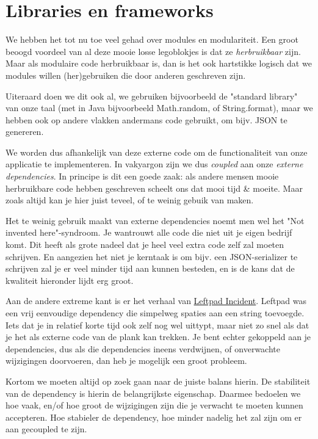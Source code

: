 \chapter{Libraries en frameworks}

We hebben het tot nu toe veel gehad over modules en modulariteit. 
Een groot beoogd voordeel van al deze mooie losse legoblokjes
is dat ze \emph{herbruikbaar} zijn. Maar als modulaire code herbruikbaar is, 
dan is het ook hartstikke logisch dat we modules willen (her)gebruiken die door anderen geschreven zijn.

Uiteraard doen we dit ook al, we gebruiken bijvoorbeeld de "standard library" van onze taal 
(met in Java bijvoorbeeld Math.random, of String.format), maar we hebben ook op andere vlakken andermans 
code gebruikt, om bijv. JSON te genereren.

We worden dus afhankelijk van deze externe code om de functionaliteit van onze applicatie te implementeren. 
In vakyargon zijn we dus \emph{coupled} aan onze \emph{externe dependencies}. In principe is dit een goede zaak:
als andere mensen mooie herbruikbare code hebben geschreven scheelt ons dat mooi tijd \& moeite. Maar zoals
altijd kan je hier juist teveel, of te weinig gebuik van maken.

Het te weinig gebruik maakt van externe dependencies noemt men wel het "Not invented here"-syndroom. 
Je wantrouwt alle code die niet uit je eigen bedrijf komt. Dit heeft als grote nadeel dat je heel veel extra
code zelf zal moeten schrijven. En aangezien het niet je kerntaak is om bijv. een JSON-serializer te schrijven
zal je er veel minder tijd aan kunnen besteden, en is de kans dat de kwaliteit hieronder lijdt erg groot.

Aan de andere extreme kant is er het verhaal van \href{https://en.wikipedia.org/wiki/Npm_left-pad_incident}{Leftpad Incident}.
Leftpad was een vrij eenvoudige dependency die simpelweg spaties aan een string toevoegde. Iets dat je in relatief
korte tijd ook zelf nog wel uittypt, maar niet zo snel als dat je het als externe code van de plank kan trekken.
Je bent echter gekoppeld aan je dependencies, dus als die dependencies ineens verdwijnen, of onverwachte wijzigingen doorvoeren,
dan heb je mogelijk een groot probleem. 

Kortom we moeten altijd op zoek gaan naar de juiste balans hierin. De stabiliteit van de dependency is hierin
de belangrijkste eigenschap. Daarmee bedoelen we hoe vaak, en/of hoe groot de wijzigingen zijn die je verwacht
te moeten kunnen accepteren. Hoe stabieler de dependency, hoe minder nadelig het zal zijn om er aan gecoupled te zijn.


